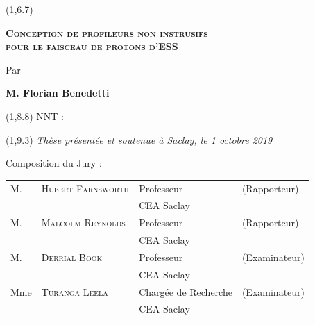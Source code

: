\begin{titlepage}
	\begin{textblock}{14}(1,6.7)
		\begin{center}	
			\Large \textsc{\textcolor{ESSColor}{
					\textbf{Conception de profileurs non instrusifs \\pour le faisceau de protons d’ESS}}}\par
			\large Par\par  \large \textbf{M. Florian Benedetti} \par
		\end{center}
	\end{textblock}
	
	\begin{textblock}{13}(1,8.8)
		NNT : 
	\end{textblock}
	
	\begin{textblock}{14}(1,9.3)
		\vspace{1.5cm}
		\hspace{1cm}\textit{Thèse présentée et soutenue à Saclay, le 1 octobre 2019}
		\vspace{0.5cm}
		\par
		\hspace{1cm}Composition du Jury :
		\begin{center}
			\begin{tabular}{llll}
				M.    & \textsc{Hubert Farnsworth} & Professeur              & (Rapporteur)            \\
				\null & \null                      & CEA Saclay              &                         \\   
				
				M.    & \textsc{Malcolm Reynolds}  & Professeur              & (Rapporteur)            \\
				\null & \null                      & CEA Saclay              &                         \\ 
				
				M.    & \textsc{Derrial Book}      & Professeur              & (Examinateur)           \\
				\null & \null                      & CEA Saclay              &                         \\ 
				
				Mme   & \textsc{Turanga Leela}     & Chargée de Recherche    & (Examinateur)           \\
				\null & \null                      & CEA Saclay              &                         \\ 
				

\end{tabular}
\end{center}
\end{textblock}
\end{titlepage}
